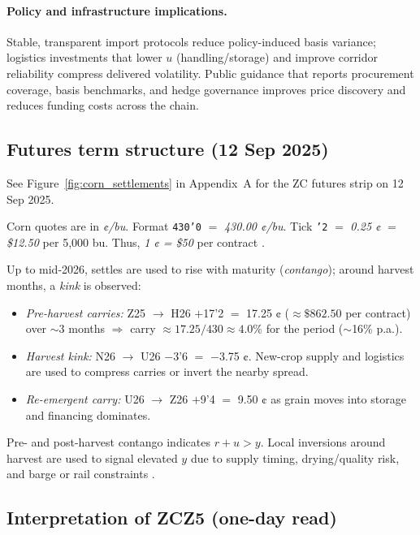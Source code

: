 \documentclass[11pt,a4paper]{article} %
\begin{document}
\paragraph{Policy and infrastructure implications.}
Stable, transparent import protocols reduce policy-induced basis variance; logistics investments that lower \(u\) (handling/storage) and improve corridor reliability compress delivered volatility. Public guidance that reports procurement coverage, basis benchmarks, and hedge governance improves price discovery and reduces funding costs across the chain.


\subsection{Futures term structure (12 Sep 2025)}

See Figure~\ref{fig:corn_settlements} in Appendix~A for the ZC futures strip on 12 Sep 2025.

Corn quotes are in \textit{¢/bu}. Format \texttt{430'0} \(=\) \textit{430.00 ¢/bu}. Tick \texttt{'2} \(=\) \textit{0.25 ¢} \(=\) \textit{\$12.50} per 5,000 bu. Thus, \textit{1 ¢ = \$50} per contract \citep{barchart_zc_specs}.


Up to mid-2026, settles are used to rise with maturity (\emph{contango}); around harvest months, a \emph{kink} is observed:
\begin{itemize}
  \item \textit{Pre-harvest carries:} Z25 \(\to\) H26 \(+\)17'2 \(=\) 17.25 ¢ (\(\approx\$862.50\) per contract) over \(\sim\)3 months \(\Rightarrow\) carry \(\approx 17.25/430\approx 4.0\%\) for the period (\(\sim\)16\% p.a.).
  \item \textit{Harvest kink:} N26 \(\to\) U26 \(-\)3'6 \(=\) \(-\)3.75 ¢. New-crop supply and logistics are used to compress carries or invert the nearby spread.
  \item \textit{Re-emergent carry:} U26 \(\to\) Z26 \(+\)9'4 \(=\) 9.50 ¢ as grain moves into storage and financing dominates.
\end{itemize}
Pre- and post-harvest contango indicates \(r+u>y\). Local inversions around harvest are used to signal elevated \(y\) due to supply timing, drying/quality risk, and barge or rail constraints \citep{ams_gtr_2023,ncga_storage_2025}.

\subsection{Interpretation of \texorpdfstring{ZCZ5}{ZCZ5} (one-day read)}
\end{document}
